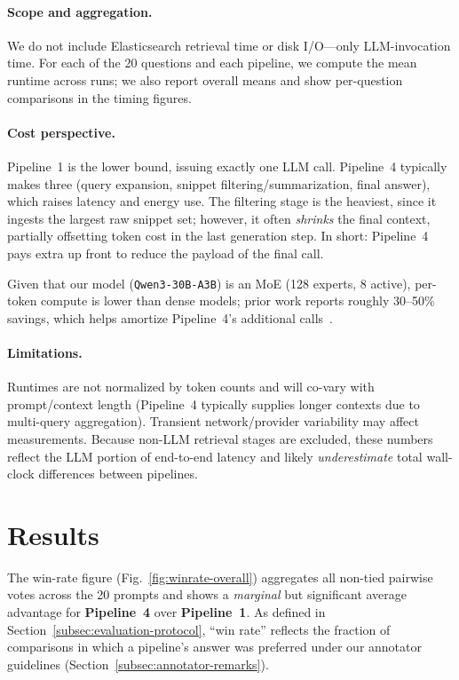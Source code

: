 \documentclass[manuscript,screen]{acmart}
\begin{document}
\begin{CCSXML}
	\paragraph{Scope and aggregation.}
	We do not include Elasticsearch retrieval time or disk I/O—only LLM-invocation time. For each
	of the 20 questions and each pipeline, we compute the mean runtime across runs; we also report
	overall means and show per-question comparisons in the timing figures.
	
	\paragraph{Cost perspective.}
	Pipeline~1 is the lower bound, issuing exactly one LLM call. Pipeline~4 typically makes three (query expansion, snippet filtering/summarization, final answer), which raises latency and energy use. The filtering stage is the heaviest, since it ingests the largest raw snippet set; however, it often \emph{shrinks} the final context, partially offsetting token cost in the last generation step. In short: Pipeline~4 pays extra up front to reduce the payload of the final call.
	
	Given that our model (\texttt{Qwen3-30B-A3B}) is an MoE (128 experts, 8 active), per-token compute is lower than dense models; prior work reports roughly 30–50\% savings, which helps amortize Pipeline~4’s additional calls~\cite{qwen3_model,yun2024inferenceoptimalmixtureofexpertlargelanguage}.

	
	\paragraph{Limitations.}
	Runtimes are not normalized by token counts and will co-vary with prompt/context length
	(Pipeline~4 typically supplies longer contexts due to multi-query aggregation). Transient
	network/provider variability may affect measurements. Because non-LLM retrieval stages are
	excluded, these numbers reflect the LLM portion of end-to-end latency and likely
	\emph{underestimate} total wall-clock differences between pipelines.

	
\section{Results}
\label{sec:results}
	
The win-rate figure (Fig.~\ref{fig:winrate-overall}) aggregates all non-tied
pairwise votes across the 20 prompts and shows a \emph{marginal} but significant average
advantage for \textbf{Pipeline~4} over \textbf{Pipeline~1}. As defined in
Section~\ref{subsec:evaluation-protocol}, “win rate” reflects the fraction of
comparisons in which a pipeline’s answer was preferred under our annotator
guidelines (Section~\ref{subsec:annotator-remarks}).


\end{CCSXML}
\end{document}
